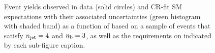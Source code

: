 \begin{figure}[h!]
\begin{center}
    \caption{Event yields observed in data (solid circles) and CR-fit SM expectations with their associated uncertainties (green histogram with shaded band) as a function of \HTmiss based on a sample of events that satisfy $n_{\text{jet}} = 4$ and $n_{\text{b}} = 3$, as well as the requirements on \scalht indicated by each sub-figure caption. }
    \label{fig:mhtval_eq4j_eq3b}
  \end{center}
\end{figure}

\begin{figure}[h!]
  \begin{center}
    \\

\end{center}
\end{figure}
